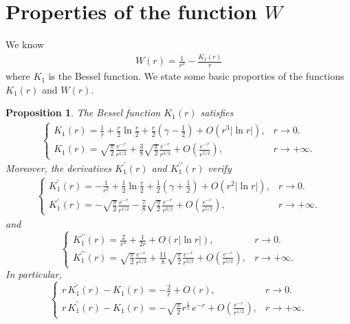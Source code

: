 \documentclass[a4paper,reqno,11pt,oneside]{amsart}
\numberwithin{equation}{section}
\renewcommand{\theequation}{\arabic{section}.\arabic{equation}}
\newtheorem{Prop}[Thm]{Proposition}
\begin{document}
 \appendix 
\section{Properties of the function $W$} \label{appA}
\setcounter{equation}{0}
\renewcommand{\theequation}{A.\arabic{equation}}
We know 
\begin{align}
    \label{ww}W(r)=\frac{1}{r^{2}}-\frac{K_{1}(r)}{r}
\end{align} 
where $K_1$ is the Bessel function. We state some basic proporties of the functions $K_{1}(r)$ and $W(r)$.
\begin{Prop}\label{bessel}
    The Bessel function $K_{1}(r)$ satisfies
\begin{align}\label{properties-11}
    \begin{cases}
        K_1(r)= \frac{1}{r}+\frac{r}{2}\ln\frac{r}{2}+\frac{r}{2}\left(\gamma-\frac{1}{2}\right)+O\left(r^3|\ln r|\right), &r\to 0.\\
        K_1(r)= \sqrt{\frac{\pi}{2}} \frac{e^{-r}}{r^{{1}/{2}}}+ \frac{3}{8}\sqrt{\frac{\pi}{2}}\frac{e^{-r}}{r^{{3}/{2}}}+O\left(\frac{e^{-r}}{r^{{5}/{2}}}\right), &r\to +\infty.
    \end{cases}
    \end{align}
    Moreover, the derivatives $K^{\prime}_{1}(r)$ and $K^{\prime\prime}_{1}(r)$ verify
    \begin{align*}\label{properties-12}
    \begin{cases}
        K^{\prime}_{1}(r)=- \frac{1}{r^2}+\frac{1}{2}\ln\frac{r}{2}+\frac{1}{2}\left(\gamma+\frac{1}{2}\right)+O\left(r^2|\ln r|\right), &r\to 0.\\
        K^{\prime}_{1}(r)= -\sqrt{\frac{\pi}{2}} \frac{e^{-r}}{r^{{1}/{2}}}-\frac{7}{8}\sqrt{\frac{\pi}{2}} \frac{e^{-r}}{r^{{3}/{2}}}+O\left(\frac{e^{-r}}{r^{{5}/{2}}}\right),&r\to +\infty.
    \end{cases}
    \end{align*}
    and
    $$\label{properties-13}
    \begin{cases}
        K^{\prime\prime}_{1}(r)=\frac{2}{r^3}+\frac{1}{2r}+O\left(r|\ln r|\right), &r\to 0.\\
        K^{\prime\prime}_{1}(r)= \sqrt{\frac{\pi}{2}}  \frac{e^{-r}}{r^{{1}/{2}}}+\frac{11}{8}\sqrt{\frac{\pi}{2}}  \frac{e^{-r}}{r^{{3}/{2}}}+O\left(\frac{e^{-r}}{r^{{5}/{2}}}\right),&r\to +\infty.
    \end{cases}
  $$
In particular, 
$$\label{properties-14}
    \begin{cases}
        r\,K^{\prime}_{1}(r)-K_{1}(r)=-\frac{2}{r}+O\left(r\right), &r\to 0.\\
        r\,K^{\prime}_{1}(r)-K_{1}(r)=  -\sqrt{\frac{\pi}{2}}r^{\frac{1}{2}}\,{e^{-r}}+O\left( \frac{e^{-r}}{r^{{1}/{2}}}\right),&r\to +\infty.
    \end{cases}
 $$
\end{Prop}
\end{document}
